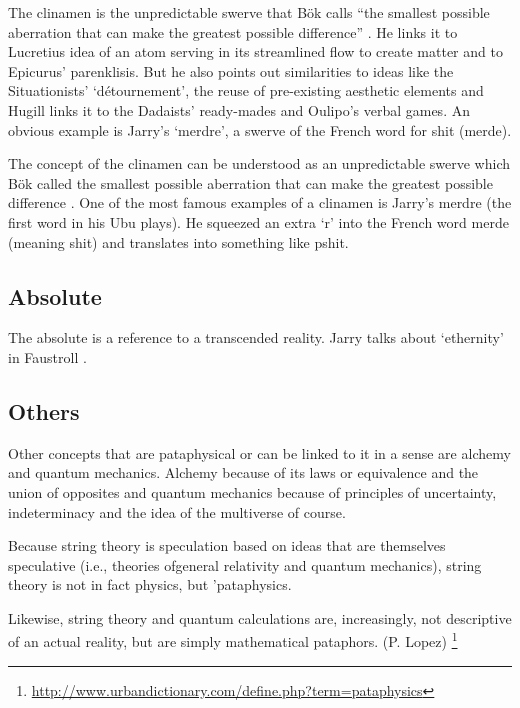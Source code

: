 The clinamen is the unpredictable swerve that Bök calls ``the smallest possible aberration that can make the greatest possible difference''  \autocite[p.43]{Boek2002}. He links it to Lucretius idea of an atom serving in its streamlined flow to create matter and to Epicurus' parenklisis. But he also points out similarities to ideas like the Situationists' `détournement', the reuse of pre-existing aesthetic elements and Hugill links it to the Dadaists' ready-mades and Oulipo's verbal games. An obvious example is Jarry's `merdre', a swerve of the French word for shit (merde).

The concept of the clinamen can be understood as an unpredictable swerve which Bök called the smallest possible aberration that can make the greatest possible difference \autocite{Boek2002}. One of the most famous examples of a clinamen is Jarry's merdre (the first word in his Ubu plays). He squeezed an extra `r' into the French word merde (meaning shit) and translates into something like pshit.


\subsection{Absolute}

The absolute is a reference to a transcended reality. Jarry talks about `ethernity' in Faustroll \autocite[p.104]{Jarry1996}.


\subsection*{Others}

Other concepts that are pataphysical or can be linked to it in a sense are alchemy and quantum mechanics. Alchemy because of its laws or equivalence and the union of opposites \autocite{Hugill2012a} and quantum mechanics because of principles of uncertainty, indeterminacy and the idea of the multiverse of course.

\begin{fcom}
  Because string theory is speculation based on ideas that are themselves speculative (i.e., theories ofgeneral relativity and quantum mechanics), string theory is not in fact physics, but 'pataphysics.
\end{fcom}

\begin{fcom}
  Likewise, string theory and quantum calculations are, increasingly, not descriptive of an actual reality, but are simply mathematical pataphors. (P. Lopez) \footnote{\url{http://www.urbandictionary.com/define.php?term=pataphysics}}
\end{fcom}


